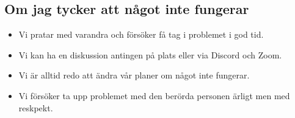 \documentclass{mall}
\begin{document}
\subsection*{Om jag tycker att något inte fungerar}
\begin{itemize}
\item Vi pratar med varandra och försöker få tag i problemet i god tid.
\item Vi kan ha en diskussion antingen på plats eller via Discord och Zoom.
\item Vi är alltid redo att ändra vår planer om något inte fungerar.
\item Vi försöker ta upp problemet med den berörda personen ärligt men med reskpekt.

\end{itemize}
\end{document}
